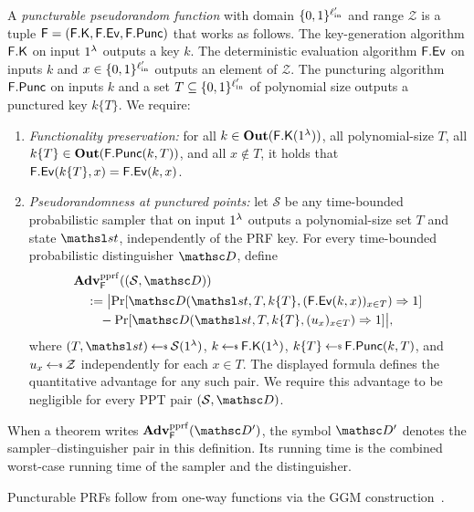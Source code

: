 \begin{definition} \label{def-pprf}
A \emph{puncturable pseudorandom function} with domain $\{0,1\}^{\ell_{\mathrm{in}}'}$ and range $\mathcal{Z}$ is a tuple $\mathsf{F} = (\mathsf{F}.\mathsf{K}, \mathsf{F}.\mathsf{Ev}, \mathsf{F}.\mathsf{Punc})$ that works as follows. The key-generation algorithm $\mathsf{F}.\mathsf{K}$ on input $1^{\lambda}$ outputs a key $k$. The deterministic evaluation algorithm $\mathsf{F}.\mathsf{Ev}$ on inputs $k$ and $x \in \{0,1\}^{\ell_{\mathrm{in}}'}$ outputs an element of $\mathcal{Z}$. The puncturing algorithm $\mathsf{F}.\mathsf{Punc}$ on inputs $k$ and a set $T \subseteq \{0,1\}^{\ell_{\mathrm{in}}'}$ of polynomial size outputs a punctured key $k\{T\}$. We require:
\begin{enumerate}
\item \emph{Functionality preservation:} for all $k \in \mathbf{Out}(\mathsf{F}.\mathsf{K}(1^{\lambda}))$, all polynomial-size $T$, all $k\{T\} \in \mathbf{Out}(\mathsf{F}.\mathsf{Punc}(k,T))$, and all $x \notin T$, it holds that $\mathsf{F}.\mathsf{Ev}(k\{T\},x) = \mathsf{F}.\mathsf{Ev}(k,x)$.
\item \emph{Pseudorandomness at punctured points:} let $\mathcal{S}$ be any time-bounded probabilistic sampler that on input $1^{\lambda}$ outputs a polynomial-size set $T$ and state $\state$, independently of the PRF key. For every time-bounded probabilistic distinguisher $\advD$, define
$$
\begin{aligned}
&\AdvPPRF{\PRF}{(\mathcal S,\advD)}\\
&\quad:=
\bigl|
\Pr\!\left[\advD(\state,T,k\{T\},(\PRFEv(k,x))_{x\in T})\Rightarrow1\right]
\\[-0.25ex]
&\qquad-
\Pr\!\left[\advD(\state,T,k\{T\},(u_x)_{x\in T})\Rightarrow1\right]
\bigr|,
\end{aligned}
$$
where $(T,\state)\getsr\mathcal{S}(\usecp)$, $k\getsr\PRFKg(\usecp)$, $k\{T\}\getsr\PRFPunc(k,T)$, and $u_x\getsr\mathcal{Z}$ independently for each $x\in T$. The displayed formula defines the quantitative advantage for any such pair. We require this advantage to be negligible for every PPT pair $(\mathcal S,\advD)$.
\end{enumerate}
\end{definition}

When a theorem writes $\AdvPPRF{\PRF}{\advD'}$, the symbol $\advD'$ denotes the sampler--distinguisher pair in this definition. Its running time is the combined worst-case running time of the sampler and the distinguisher.

Puncturable PRFs follow from one-way functions via the GGM construction~\cite{AC:BonWat13,EC:BoyGilIsh15,CCS:KPTZ13}.


